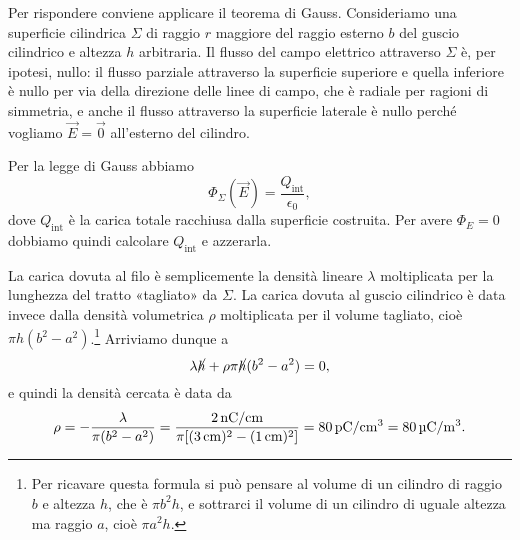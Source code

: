 \documentclass[10pt]{gulartcl}
\begin{document}
\begin{solution}
Per rispondere conviene applicare il teorema di Gauss. Consideriamo una
superficie cilindrica $\Sigma$ di raggio $r$ maggiore del raggio esterno
$b$ del guscio cilindrico e altezza $h$ arbitraria. Il flusso del campo
elettrico attraverso $\Sigma$ è, per ipotesi, nullo: il flusso parziale
attraverso la superficie superiore e quella inferiore è nullo per via della
direzione delle linee di campo, che è radiale per ragioni di simmetria, e
anche il flusso attraverso la superficie laterale è nullo perché vogliamo
$\vec{E} = \vec{0}$ all’esterno del cilindro.

Per la legge di Gauss abbiamo
\begin{equation}
    \Phi_{\Sigma}(\vec{E}) = \frac{Q_{\mathrm{int}}}{\epsilon_0}, 
\end{equation}
dove $Q_{\mathrm{int}}$ è la carica totale racchiusa dalla superficie
costruita. Per avere $\Phi_{E} = 0$ dobbiamo quindi calcolare
$Q_{\mathrm{int}}$ e azzerarla.

La carica dovuta al filo è semplicemente la densità lineare $\lambda$
moltiplicata per la lunghezza del tratto «tagliato» da $\Sigma$. La carica
dovuta al guscio cilindrico è data invece dalla densità volumetrica $\rho$
moltiplicata per il volume tagliato, cioè $\pi h (b^{2} -
a^{2})$.\footnote{Per ricavare questa formula si può pensare al volume di
    un cilindro di raggio $b$ e altezza $h$, che è $\pi b^{2} h$, e
    sottrarci il volume di un cilindro di uguale altezza ma raggio
    $a$, cioè $\pi a^{2} h$.} Arriviamo dunque a
\begin{equation}
    \lambda \cancel{h} + \rho \pi \cancel{h} (b^{2} - a^{2}) = 0,
\end{equation}
e quindi la densità cercata è data da
\begin{equation}
    \rho = - \frac{\lambda}{\pi(b^{2} - a^{2})} = \frac{\qty{2}{nC \per
    cm}}{\pi [(\qty{3}{cm})^{2} - (\qty{1}{cm})^{2}]} = \qty{80}{pC \per
    \cm\cubed} = \qty{80}{\micro C \per m\cubed}.
\end{equation}
\end{solution}
\end{document}
